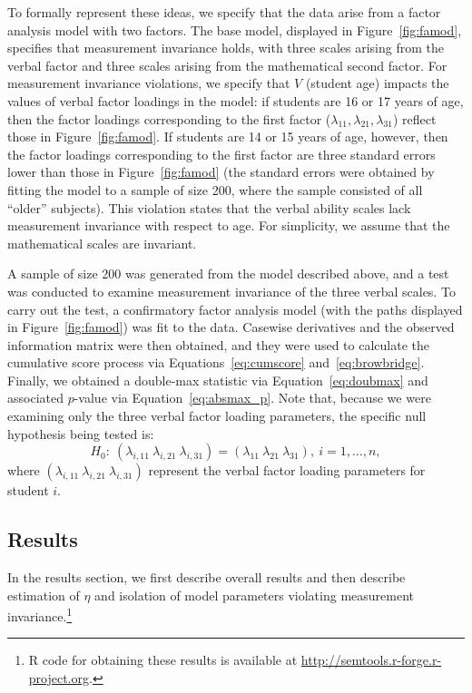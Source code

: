 \documentclass[man]{apa}
\begin{document}
To formally represent these ideas, we specify that the data arise from
a factor analysis model with two factors.  The base model, displayed in
Figure~\ref{fig:famod}, specifies that measurement invariance holds,
with three scales arising from the verbal factor and three 
scales arising from the mathematical second factor.
For measurement invariance violations, we specify that $V$
(student age) impacts the values of 
verbal factor loadings in the model: 
if students are 16 or 17 years of age, then the factor
loadings corresponding to the first 
factor ($\lambda_{11}, \lambda_{21}, \lambda_{31}$) reflect those in
Figure~\ref{fig:famod}.  If students are 14 or 15 years of age,
however, then the factor loadings corresponding to the first factor
are three standard errors lower than those in Figure~\ref{fig:famod}
(the standard errors were obtained by fitting
  the model to a sample of size 200, where the sample consisted of all
  ``older'' subjects).
This violation states that the verbal ability scales
lack measurement invariance with respect to age.  For simplicity, we
assume that the mathematical scales are invariant.



A sample of size 200 was generated from the model described above, and
a test was conducted to examine measurement invariance of the three
verbal scales.  To carry out
the test, a confirmatory factor analysis model (with the paths
displayed in Figure~\ref{fig:famod}) was fit to the
data.  Casewise derivatives and 
the observed information matrix were then obtained, and they were used
to calculate the cumulative score process via
Equations~\eqref{eq:cumscore} and~\eqref{eq:browbridge}.  Finally, we
obtained a 
double-max statistic via Equation~\eqref{eq:doubmax} and associated
$p$-value via Equation~\eqref{eq:absmax_p}.  Note that, because we
were examining only the three verbal factor loading parameters, the
specific null hypothesis being tested is:
\begin{equation}
    \label{eq:exh0}
H_0:\ (\lambda_{i,11}\ \lambda_{i,21}\ \lambda_{i,31}) =
(\lambda_{11}\ \lambda_{21}\ \lambda_{31}),\ i=1,\ldots,n,
\end{equation}
where $(\lambda_{i,11}\ \lambda_{i,21}\ \lambda_{i,31})$ represent the
verbal factor loading parameters for student $i$.

\subsection{Results}
In the results section, we first describe overall results and then 
describe estimation of $\eta$ and 
isolation of model parameters violating
measurement invariance.\footnote{R code for obtaining these results is
  available at \url{http://semtools.r-forge.r-project.org}.}
\end{document}
